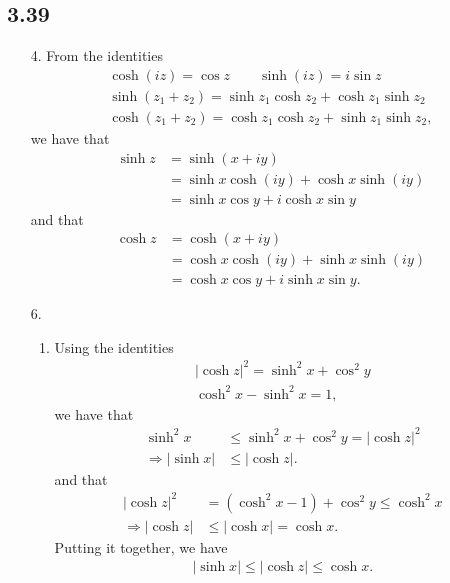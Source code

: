 \documentclass[a4paper,12pt]{article}
\begin{document}
\subsection*{3.39}
\begin{enumerate}
    \item[4.]
        From the identities
        \begin{gather*}
            \cosh(iz) = \cos z \qquad \sinh(iz) = i \sin z \\
            \sinh(z_1 + z_2) = \sinh z_1 \cosh z_2 + \cosh z_1 \sinh z_2 \\
            \cosh(z_1 + z_2) = \cosh z_1 \cosh z_2 + \sinh z_1 \sinh z_2,
        \end{gather*}
        we have that
        \begin{align*}
            \sinh z &= \sinh(x + iy) \\
            &= \sinh x \cosh(iy) + \cosh x \sinh(iy) \\
            &= \sinh x \cos y + i \cosh x \sin y
        \end{align*}
        and that
        \begin{align*}
            \cosh z &= \cosh(x + iy) \\
            &= \cosh x \cosh(iy) + \sinh x \sinh(iy) \\
            &= \cosh x \cos y + i \sinh x \sin y.
        \end{align*}

    \item[6.]
        \begin{enumerate}
            \item
                Using the identities
                \begin{gather*}
                    |\cosh z|^2 = \sinh^2 x + \cos^2 y \\
                    \cosh^2 x - \sinh^2 x = 1,
                \end{gather*}
                we have that
                \begin{align*}
                    \sinh^2 x &\leq \sinh^2 x + \cos^2 y = |\cosh z|^2 \\
                    \Rightarrow |\sinh x| &\leq |\cosh z|.
                \end{align*}
                and that
                \begin{align*}
                    |\cosh z|^2 &= (\cosh^2 x - 1) + \cos^2 y \leq \cosh^2 x \\
                    \Rightarrow |\cosh z| &\leq |\cosh x| = \cosh x.
                \end{align*}
                Putting it together, we have
                \begin{align*}
                    |\sinh x| \leq |\cosh z| \leq \cosh x.
                \end{align*}


\end{enumerate}
\end{enumerate}
\end{document}
